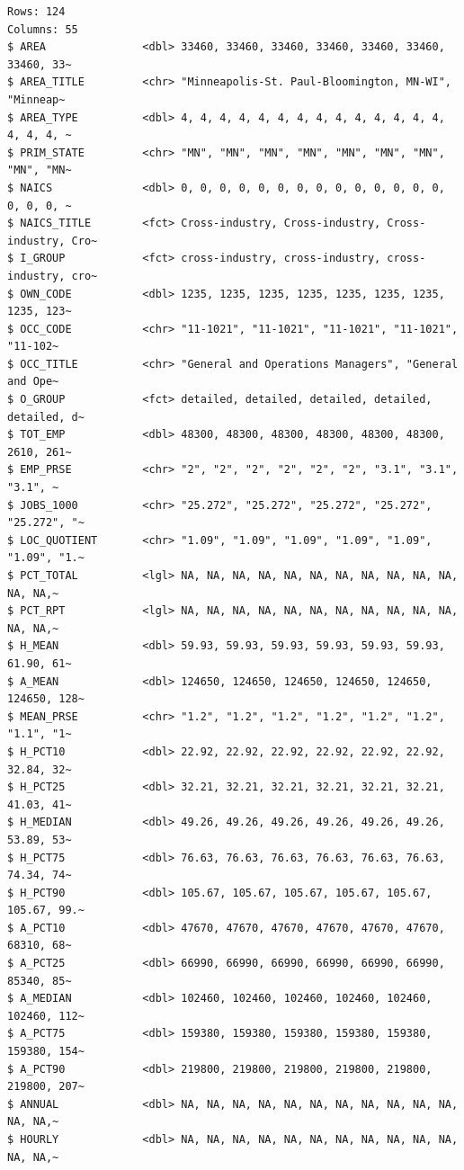 \documentclass[
  letterpaper,
  DIV=11,
  numbers=noendperiod]{scrartcl}
\begin{document}
\begin{verbatim}
Rows: 124
Columns: 55
$ AREA               <dbl> 33460, 33460, 33460, 33460, 33460, 33460, 33460, 33~
$ AREA_TITLE         <chr> "Minneapolis-St. Paul-Bloomington, MN-WI", "Minneap~
$ AREA_TYPE          <dbl> 4, 4, 4, 4, 4, 4, 4, 4, 4, 4, 4, 4, 4, 4, 4, 4, 4, ~
$ PRIM_STATE         <chr> "MN", "MN", "MN", "MN", "MN", "MN", "MN", "MN", "MN~
$ NAICS              <dbl> 0, 0, 0, 0, 0, 0, 0, 0, 0, 0, 0, 0, 0, 0, 0, 0, 0, ~
$ NAICS_TITLE        <fct> Cross-industry, Cross-industry, Cross-industry, Cro~
$ I_GROUP            <fct> cross-industry, cross-industry, cross-industry, cro~
$ OWN_CODE           <dbl> 1235, 1235, 1235, 1235, 1235, 1235, 1235, 1235, 123~
$ OCC_CODE           <chr> "11-1021", "11-1021", "11-1021", "11-1021", "11-102~
$ OCC_TITLE          <chr> "General and Operations Managers", "General and Ope~
$ O_GROUP            <fct> detailed, detailed, detailed, detailed, detailed, d~
$ TOT_EMP            <dbl> 48300, 48300, 48300, 48300, 48300, 48300, 2610, 261~
$ EMP_PRSE           <chr> "2", "2", "2", "2", "2", "2", "3.1", "3.1", "3.1", ~
$ JOBS_1000          <chr> "25.272", "25.272", "25.272", "25.272", "25.272", "~
$ LOC_QUOTIENT       <chr> "1.09", "1.09", "1.09", "1.09", "1.09", "1.09", "1.~
$ PCT_TOTAL          <lgl> NA, NA, NA, NA, NA, NA, NA, NA, NA, NA, NA, NA, NA,~
$ PCT_RPT            <lgl> NA, NA, NA, NA, NA, NA, NA, NA, NA, NA, NA, NA, NA,~
$ H_MEAN             <dbl> 59.93, 59.93, 59.93, 59.93, 59.93, 59.93, 61.90, 61~
$ A_MEAN             <dbl> 124650, 124650, 124650, 124650, 124650, 124650, 128~
$ MEAN_PRSE          <chr> "1.2", "1.2", "1.2", "1.2", "1.2", "1.2", "1.1", "1~
$ H_PCT10            <dbl> 22.92, 22.92, 22.92, 22.92, 22.92, 22.92, 32.84, 32~
$ H_PCT25            <dbl> 32.21, 32.21, 32.21, 32.21, 32.21, 32.21, 41.03, 41~
$ H_MEDIAN           <dbl> 49.26, 49.26, 49.26, 49.26, 49.26, 49.26, 53.89, 53~
$ H_PCT75            <dbl> 76.63, 76.63, 76.63, 76.63, 76.63, 76.63, 74.34, 74~
$ H_PCT90            <dbl> 105.67, 105.67, 105.67, 105.67, 105.67, 105.67, 99.~
$ A_PCT10            <dbl> 47670, 47670, 47670, 47670, 47670, 47670, 68310, 68~
$ A_PCT25            <dbl> 66990, 66990, 66990, 66990, 66990, 66990, 85340, 85~
$ A_MEDIAN           <dbl> 102460, 102460, 102460, 102460, 102460, 102460, 112~
$ A_PCT75            <dbl> 159380, 159380, 159380, 159380, 159380, 159380, 154~
$ A_PCT90            <dbl> 219800, 219800, 219800, 219800, 219800, 219800, 207~
$ ANNUAL             <dbl> NA, NA, NA, NA, NA, NA, NA, NA, NA, NA, NA, NA, NA,~
$ HOURLY             <dbl> NA, NA, NA, NA, NA, NA, NA, NA, NA, NA, NA, NA, NA,~

\end{verbatim}
\end{document}
